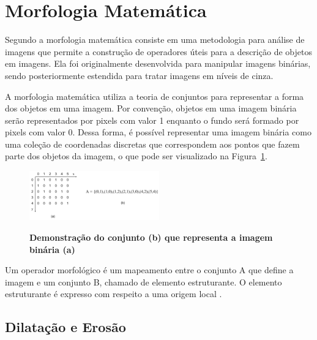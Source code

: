 \documentclass[12pt,oneside,a4paper,english,french,spanish,brazil,]{abntex2}
\begin{document}
\section{Morfologia Matemática}

Segundo \citet{pedrini:2008} a morfologia matemática consiste em uma metodologia para análise de imagens que permite a construção de operadores úteis para a descrição de objetos em imagens. Ela foi originalmente desenvolvida para manipular imagens binárias, sendo posteriormente estendida para tratar imagens em níveis de cinza.

A morfologia matemática utiliza a teoria de conjuntos para representar a forma dos objetos em uma imagem. Por convenção, objetos em uma imagem binária serão representados por pixels com valor 1 enquanto o fundo será formado por pixels com valor 0. Dessa forma, é possível representar uma imagem binária como uma coleção de coordenadas discretas que correspondem aos pontos que fazem parte dos objetos da imagem, o que pode ser visualizado na Figura~\ref{fig:PDI_Conjunto}.

\begin{figure}[ht]
\centering
\caption{\textbf{Demonstração do conjunto (b) que representa a imagem binária (a)}}
\includegraphics[width=0.5\textwidth]{imagens/PDI_Conjunto.pdf}
\label{fig:PDI_Conjunto}
\end{figure}

Um operador morfológico é um mapeamento entre o conjunto A que define a imagem e um conjunto B, chamado de elemento estruturante. O elemento estruturante é expresso com respeito a uma origem local \cite{pedrini:2008}.

\subsection{Dilatação e Erosão}

\end{document}
